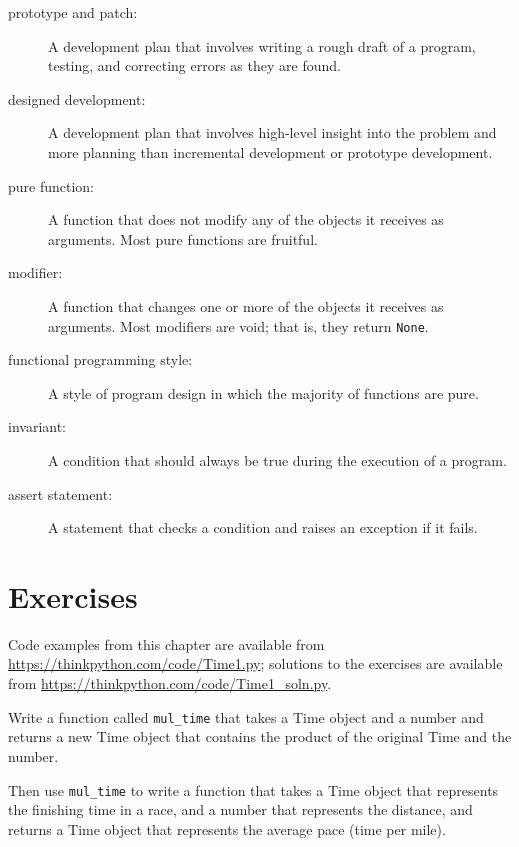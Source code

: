 \documentclass[10pt]{book}
\begin{document}
\begin{description}

\item[prototype and patch:] A development plan that involves
writing a rough draft of a program, testing, and correcting errors as
they are found.

\item[designed development:] A development plan that involves
high-level insight into the problem and more planning than incremental
development or prototype development.

\item[pure function:] A function that does not modify any of the objects it
receives as arguments.  Most pure functions are fruitful.

\item[modifier:] A function that changes one or more of the objects it
  receives as arguments.  Most modifiers are void; that is, they
  return {\tt None}.  

\item[functional programming style:] A style of program design in which the
majority of functions are pure.

\item[invariant:] A condition that should always be true during the
execution of a program.

\item[assert statement:] A statement that checks a condition and raises
an exception if it fails.

\end{description}


\section{Exercises}

Code examples from this chapter are available from
\url{https://thinkpython.com/code/Time1.py}; solutions to the
exercises are available from \url{https://thinkpython.com/code/Time1_soln.py}.

\begin{exercise}

Write a function called \verb"mul_time" that takes a Time object
and a number and returns a new Time object that contains
the product of the original Time and the number.

Then use \verb"mul_time" to write a function that takes a Time
object that represents the finishing time in a race, and a number
that represents the distance, and returns a Time object that represents
the average pace (time per mile).

\end{exercise}
\end{document}
